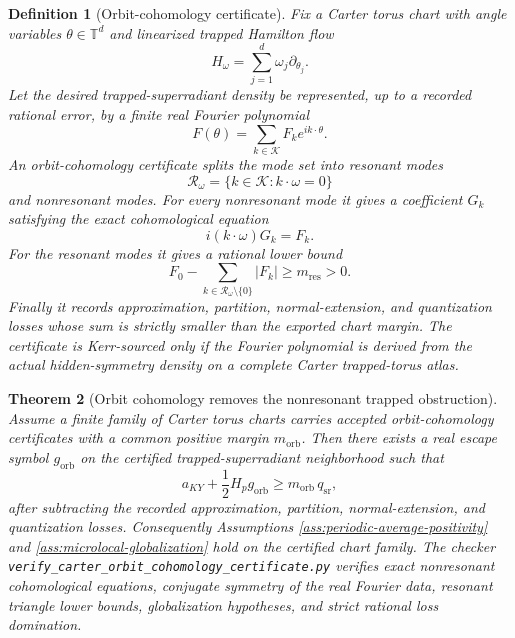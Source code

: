 \documentclass[12pt,a4paper]{article}
\newtheorem{theorem}{Theorem}[section]
\newtheorem{definition}[theorem]{Definition}
\begin{document}
\begin{definition}[Orbit-cohomology certificate]\label{def:orbit-cohomology-certificate}
Fix a Carter torus chart with angle variables $\theta\in\mathbb T^d$ and
linearized trapped Hamilton flow
\[
H_{\omega}=\sum_{j=1}^d \omega_j\partial_{\theta_j}.
\]
Let the desired trapped-superradiant density be represented, up to a recorded
rational error, by a finite real Fourier polynomial
\[
F(\theta)=\sum_{k\in\mathcal K} F_k e^{ik\cdot\theta}.
\]
An orbit-cohomology certificate splits the mode set into resonant modes
\[
\mathcal R_\omega=\{k\in\mathcal K:k\cdot\omega=0\}
\]
and nonresonant modes.  For every nonresonant mode it gives a coefficient
$G_k$ satisfying the exact cohomological equation
\[
i(k\cdot\omega)G_k=F_k.
\]
For the resonant modes it gives a rational lower bound
\[
F_0-\sum_{k\in\mathcal R_\omega\setminus\{0\}} |F_k|
\ge m_{\mathrm{res}}>0.
\]
Finally it records approximation, partition, normal-extension, and quantization
losses whose sum is strictly smaller than the exported chart margin.  The
certificate is Kerr-sourced only if the Fourier polynomial is derived from the
actual hidden-symmetry density on a complete Carter trapped-torus atlas.
\end{definition}

\begin{theorem}[Orbit cohomology removes the nonresonant trapped obstruction]\label{thm:orbit-cohomology-breakthrough}
Assume a finite family of Carter torus charts carries accepted
orbit-cohomology certificates with a common positive margin
$m_{\mathrm{orb}}$.  Then there exists a real escape symbol $g_{\mathrm{orb}}$
on the certified trapped-superradiant neighborhood such that
\[
a_{KY}+\frac12H_pg_{\mathrm{orb}}
\ge m_{\mathrm{orb}}\,q_{\mathrm{sr}},
\]
after subtracting the recorded approximation, partition, normal-extension, and
quantization losses.  Consequently Assumptions
\ref{ass:periodic-average-positivity} and \ref{ass:microlocal-globalization}
hold on the certified chart family.  The checker
\texttt{verify\_carter\_orbit\_cohomology\_certificate.py} verifies exact
nonresonant cohomological equations, conjugate symmetry of the real Fourier
data, resonant triangle lower bounds, globalization hypotheses, and strict
rational loss domination.
\end{theorem}
\end{document}
